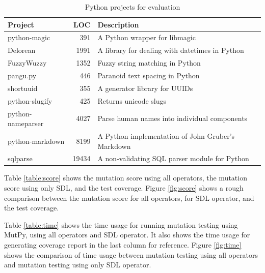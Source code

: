 \documentclass[12pt]{article}
\begin{document}
\begin{table}[H]
\begin{center}
\caption{Python projects for evaluation}
\label{table:projects}
\begin{tabular}{|l|r|l|}
\hline
{\bf Project} & {\bf LOC} & {\bf Description} \\
\hline
python-magic      & 391   & A Python wrapper for libmagic \\
Delorean          & 1991  & A library for dealing with datetimes in Python \\
FuzzyWuzzy        & 1352  & Fuzzy string matching in Python \\
pangu.py          & 446   & Paranoid text spacing in Python \\
shortuuid         & 355   & A generator library for UUIDs \\
python-slugify    & 425   & Returns unicode slugs \\
python-nameparser & 4027  & Parse human names into individual components \\
python-markdown   & 8199  & A Python implementation of John Gruber’s Markdown \\
sqlparse          & 19434 & A non-validating SQL parser module for Python \\
\hline
\end{tabular}
\end{center}
\end{table}

Table \ref{table:score} shows the mutation score using all operators, the mutation score using only SDL, and the test coverage. Figure \ref{fig:score} shows a rough comparison between the mutation score for all operators, for SDL operator, and the test coverage.

Table \ref{table:time} shows the time usage for running mutation testing using MutPy, using all operators and SDL operator. It also shows the time usage for generating coverage report in the last column for reference. Figure \ref{fig:time} shows the comparison of time usage between mutation testing using all operators and mutation testing using only SDL operator.
\end{document}
